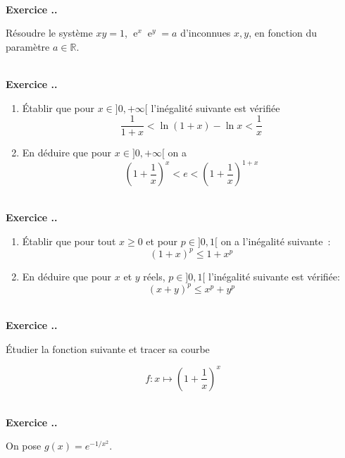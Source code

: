 \documentclass{article}
\newcommand{\ex}{\operatorname{e}}
\newcommand{\mb}[1]{\mathbb{#1}}
\newcounter{exo}
\newcommand{\exercice}[1][\null]{\textbf{\\ \large Exercice \thesection.\theexo. \normalsize #1} \addtocounter{exo}{1}}
\begin{document}
\exercice

Résoudre le système $xy = 1$, ${\ex}^x {\ex}^y =a$ d'inconnues $x,y$, en fonction du paramètre $a \in \mb{R}$.


\exercice 

\begin{enumerate}
    \item Établir que pour $x \in ]0, +\infty[$ l'inégalité suivante
        est vérifiée
        \begin{equation*}
            \frac{1}{1+x} < \ln (1 + x) - \ln x < \frac{1}{x}
        \end{equation*}

    \item En déduire que pour $x \in ]0,+\infty[$ on a
        \begin{equation*}
            \left(1 + \frac{1}{x}\right)^x < e < \left(1 + \frac{1}{x}\right)^{1 + x}
        \end{equation*}
\end{enumerate}

\exercice 

\begin{enumerate}
    \item Établir que pour tout $x \geq 0$ et pour $p \in ]0,1[$ on a 
        l'inégalité suivante~:
        \begin{equation*}
            (1 + x)^p \leq 1 + x^p
        \end{equation*}

    \item En déduire que pour $x$ et $y$ réels, $p \in ]0,1[$
        l'inégalité suivante est vérifiée:
        \begin{equation*}
            (x + y)^p \leq x^p + y^p
        \end{equation*}
\end{enumerate}

\exercice

Étudier la fonction suivante et tracer sa courbe 

\begin{equation*}
    f : x \mapsto \left(1 + \frac{1}{x}\right)^x
\end{equation*}

\exercice

On pose $g(x) = e^{-1/x^2}$.
\end{document}
